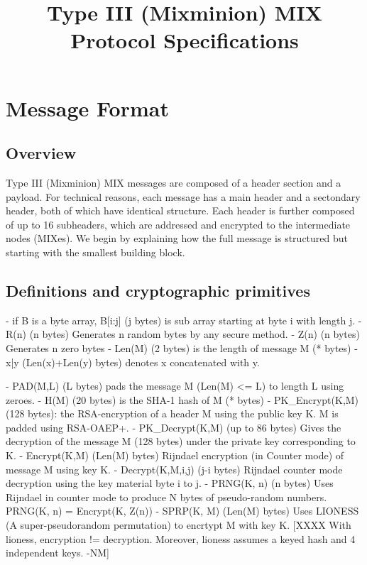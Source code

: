 \title{Type III (Mixminion) MIX Protocol Specifications}

\section{Message Format}

\subsection{Overview}

Type III (Mixminion) MIX messages are composed of a header section and a
payload.  For technical reasons, each message has a main header and a
sectondary header, both of which have identical structure.  Each
header is further composed of up to 16 subheaders, which are
addressed and encrypted to the intermediate nodes (MIXes).  We
begin by explaining how the full message is structured but starting
with the smallest building block.

\subsection{Definitions and cryptographic primitives}

- if B is a byte array, B[i:j] (j bytes) is sub array starting at 
  byte i with length j.
- R(n) (n bytes) Generates n random bytes by any secure method.
- Z(n) (n bytes) Generates n zero bytes
- Len(M) (2 bytes) is the length of message M (* bytes)
- x|y (Len(x)+Len(y) bytes) denotes x concatenated with y.

- PAD(M,L) (L bytes) pads the message M (Len(M) <= L) to length L
  using zeroes.
- H(M) (20 bytes) is the SHA-1 hash of M (* bytes)
- PK_Encrypt(K,M) (128 bytes): the RSA-encryption of a header M 
  using the public key K.  M is padded using RSA-OAEP+.
- PK_Decrypt(K,M) (up to 86 bytes) Gives the decryption of the
  message M (128 bytes) under the private key corresponding to K.
- Encrypt(K,M) (Len(M) bytes) Rijndael encryption (in Counter mode)
  of message M using key K. 
- Decrypt(K,M,i,j) (j-i bytes) Rijndael counter mode decryption 
  using the key material byte i to j.
- PRNG(K, n) (n bytes) Uses Rijndael in counter mode to produce N
  bytes of pseudo-random numbers.
  PRNG(K, n) = Encrypt(K, Z(n))
- SPRP(K, M) (Len(M) bytes) Uses LIONESS (A super-pseudorandom
  permutation) to encrtypt M with key K.
    [XXXX With lioness, encryption != decryption.  Moreover, lioness 
        assumes a keyed hash and 4 independent keys.  -NM]
  

